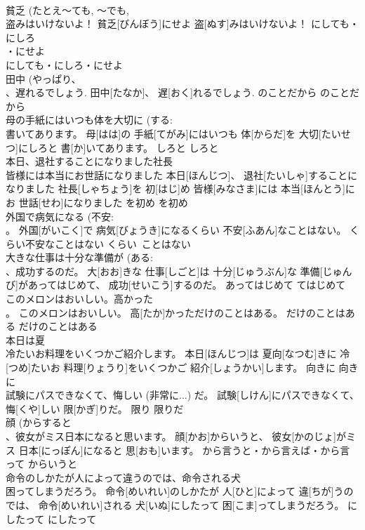 \documentclass[8pt]{extreport}
\begin{document}
\begin{CJK}{UTF8}{min}
\\	貧乏 (たとえ～ても, ～でも, 
\\	盗みはいけないよ！	貧乏[びんぼう]にせよ 盗[ぬす]みはいけないよ！	にしても・にしろ
\\	・にせよ
\\	にしても・にしろ・にせよ	
\\	田中 (やっぱり、
\\	、遅れるでしょう.	田中[たなか]、 遅[おく]れるでしょう.	のことだから	のことだから	
\\	母の手紙にはいつも体を大切に (する: 
\\	書いてあります。	母[はは]の 手紙[てがみ]にはいつも 体[からだ]を 大切[たいせつ]にしろと 書[か]いてあります。	しろと	しろと	
\\	本日、退社することになりました社長 
\\	皆様には本当にお世話になりました	本日[ほんじつ]、 退社[たいしゃ]することになりました 社長[しゃちょう]を 初[はじ]め 皆様[みなさま]には 本当[ほんとう]にお 世話[せわ]になりました	を初め	を初め	
\\	外国で病気になる (不安: 
\\	。	外国[がいこく]で 病気[びょうき]になるくらい 不安[ふあん]なことはない。	くらい不安なことはない	くらい~ことはない	
\\	大きな仕事は十分な準備が (ある: 
\\	、成功するのだ。	大[おお]きな 仕事[しごと]は 十分[じゅうぶん]な 準備[じゅんび]があってはじめて、 成功[せいこう]するのだ。	あってはじめて	てはじめて	
\\	このメロンはおいしい。高かった 
\\	。	このメロンはおいしい。 高[たか]かっただけのことはある。	だけのことはある	だけのことはある	
\\	本日は夏 
\\	冷たいお料理をいくつかご紹介します。	本日[ほんじつ]は 夏向[なつむ]きに 冷[つめ]たいお 料理[りょうり]をいくつかご 紹介[しょうかい]します。	向きに	向きに	
\\	試験にパスできなくて、悔しい (非常に...) だ。	試験[しけん]にパスできなくて、 悔[くや]しい 限[かぎ]りだ。	限り	限りだ	
\\	顔 (からすると 
\\	、彼女がミス日本になると思います。	顔[かお]からいうと、 彼女[かのじょ]がミス 日本[にっぽん]になると 思[おも]います。	から言うと・から言えば・から言って	からいうと	
\\	命令のしかたが人によって違うのでは、命令される犬 
\\	困ってしまうだろう。	命令[めいれい]のしかたが 人[ひと]によって 違[ちが]うのでは、 命令[めいれい]される 犬[いぬ]にしたって 困[こま]ってしまうだろう。	にしたって	にしたって	

\end{CJK}
\end{document}
